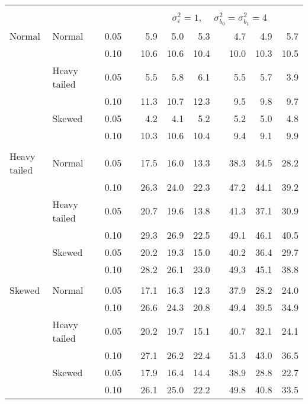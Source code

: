 \begin{table}[ht]
\begin{scriptsize}
\begin{center}
\begin{tabular}{ll p{.1cm} c p{.1cm} rrr p{.1cm} rrr}
&&&&&&&&&&&\\
& && && \multicolumn{7}{c}{$\sigma_{\varepsilon}^2 = 1$, \ \ $\sigma_{b_0}^2 = \sigma_{b_1}^2 = 4$} \\ \cline{6-12}
\rowcolor{gray!20}Normal       & Normal       && 0.05 &&   5.9 & 5.0 & 5.3 &   & 4.7 & 4.9 & 5.7 \\ 
\rowcolor{gray!20}             &              && 0.10 &&   10.6 & 10.6 & 10.4 &   & 10.0 & 10.3 & 10.5 \\ 
\rowcolor{gray!20}             & Heavy tailed && 0.05 &&   5.5 & 5.8 & 6.1 &   & 5.5 & 5.7 & 3.9 \\ 
\rowcolor{gray!20}             &              && 0.10 &&   11.3 & 10.7 & 12.3 &   & 9.5 & 9.8 & 9.7 \\ 
\rowcolor{gray!20}             & Skewed       && 0.05 &&   4.2 & 4.1 & 5.2 &   & 5.2 & 5.0 & 4.8 \\ 
\rowcolor{gray!20}             &              && 0.10 &&   10.3 & 10.6 & 10.4 &   & 9.4 & 9.1 & 9.9 \\ 
&&&&&&&&&&&\\
Heavy tailed & Normal       && 0.05 &&   17.5 & 16.0 & 13.3 &   & 38.3 & 34.5 & 28.2 \\ 
             &              && 0.10 &&   26.3 & 24.0 & 22.3 &   & 47.2 & 44.1 & 39.2 \\ 
             & Heavy tailed && 0.05 &&   20.7 & 19.6 & 13.8 &   & 41.3 & 37.1 & 30.9 \\ 
             &              && 0.10 &&   29.3 & 26.9 & 22.5 &   & 49.1 & 46.1 & 40.5 \\ 
             & Skewed       && 0.05 &&   20.2 & 19.3 & 15.0 &   & 40.2 & 36.4 & 29.7 \\ 
             &              && 0.10 &&   28.2 & 26.1 & 23.0 &   & 49.3 & 45.1 & 38.8 \\ 
&&&&&&&&&&&\\
Skewed       & Normal       && 0.05 &&   17.1 & 16.3 & 12.3 &   & 37.9 & 28.2 & 24.0 \\ 
             &              && 0.10 &&   26.6 & 24.3 & 20.8 &   & 49.4 & 39.5 & 34.9 \\ 
             & Heavy tailed && 0.05 &&   20.2 & 19.7 & 15.1 &   & 40.7 & 32.1 & 24.1 \\ 
             &              && 0.10 &&   27.1 & 26.2 & 22.4 &   & 51.3 & 43.0 & 36.5 \\ 
             & Skewed       && 0.05 &&   17.9 & 16.4 & 14.4 &   & 38.9 & 28.8 & 22.7 \\ 
             &              && 0.10 &&   26.1 & 25.0 & 22.2 &   & 49.8 & 40.8 & 33.5 \\ 

\hline
\end{tabular}
\end{center}
\end{scriptsize}
\end{table}

